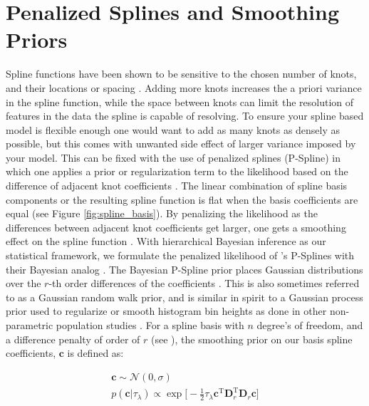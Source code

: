 \section{Penalized Splines and Smoothing Priors}\label{sec:psplines}

Spline functions have been shown to be sensitive to the chosen number of knots, and their locations or spacing \citep{deBoor78}. 
Adding more knots increases the a priori variance in the spline function, while the space between knots can limit the 
resolution of features in the data the spline is capable of resolving. To ensure your spline based model is flexible enough 
one would want to add as many knots as densely as possible, but this comes with unwanted side effect of larger variance imposed by your model. 
This can be fixed with the use of penalized splines (P-Spline) in which one applies a prior or regularization term 
to the likelihood based on the difference of adjacent knot coefficients \citep{eilers2021practical}. The linear combination of spline basis components 
or the resulting spline function is flat when the basis coefficients are equal (see Figure \ref{fig:spline_basis}). By penalizing the likelihood as 
the differences between adjacent knot coefficients get larger, one gets a smoothing effect on the spline function \citep{eilers2021practical}. 
With hierarchical Bayesian inference as our statistical framework, we formulate the penalized likelihood of \citet{eilers2021practical}'s P-Splines with 
their Bayesian analog \citep{BayesianPSplines}. The Bayesian P-Spline prior places Gaussian distributions over the $r$-th order differences of the 
coefficients \citep{BayesianPSplines,Jullion2007RobustSO}. This is also sometimes referred to as a Gaussian random walk prior, and is similar in spirit to a Gaussian process prior used to regularize or smooth histogram bin heights as done in other non-parametric population studies \citep{Mandel_2016,o3b_astro_dist}. 
For a spline basis with $n$ degree's of freedom, and a difference penalty of order of $r$ (see \citet{eilers2021practical}), 
the smoothing prior on our basis spline coefficients, $\bm{c}$ is defined as:

\begin{eqnarray}
\bm{c} \sim \mathcal{N}(0, \sigma) \\
p(\bm{c} | \tau_\lambda) \propto \exp \big[ -\frac{1}{2} \tau_\lambda \bm{c}^{\mathrm{T}} \bm{D}_{r}^{\mathrm{T}} \bm{D}_r \bm{c}  \big] 
\end{eqnarray}

